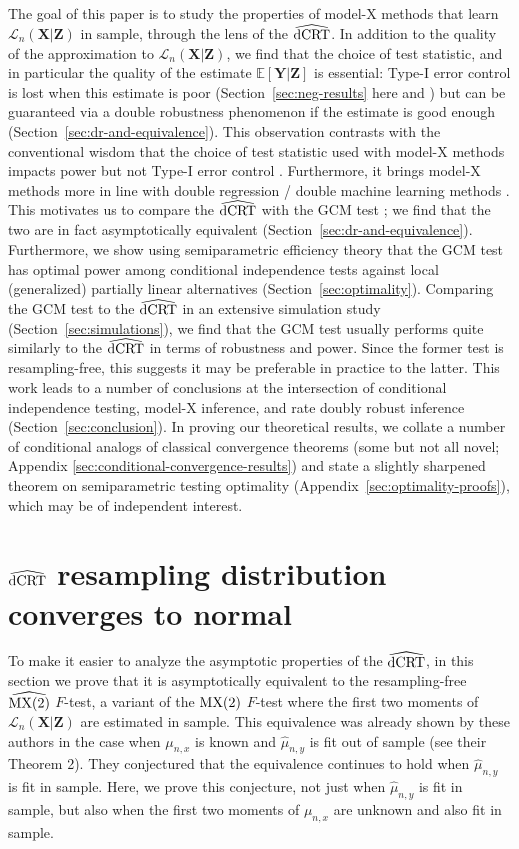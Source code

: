 \documentclass[12pt]{article}
\theoremstyle{definition}
\theoremstyle{remark}
\newcommand{\E}{\mathbb E}								%
\newcommand{\prx}{\bm X}								%
\newcommand{\prz}{\bm Z}								%
\newcommand{\pry}{{\bm Y}}								%
\newcommand{\law}{\mathcal L}							%
\newcommand{\dCRThat}{\widehat{\textnormal{dCRT}}}		%
\newcommand{\MXtwohat}{\widehat{\textnormal{MX(2)}}}		%
\newcommand{\MXtwo}{\textnormal{MX(2)}}                 %
\begin{document}
	The goal of this paper is to study the properties of model-X methods that learn $\law_n(\prx|\prz)$ in sample, through the lens of the $\dCRThat$. In addition to the quality of the approximation to $\law_n(\prx|\prz)$, we find that the choice of test statistic, and in particular the quality of the estimate $\E[\pry|\prz]$ is essential: Type-I error control is lost when this estimate is poor (Section~\ref{sec:neg-results} here and \cite{Li2022}) but can be guaranteed via a double robustness phenomenon if the estimate is good enough (Section~\ref{sec:dr-and-equivalence}). This observation contrasts with the conventional wisdom that the choice of test statistic used with model-X methods impacts power \citep{Katsevich2020a} but not Type-I error control \citep{CetL16}. Furthermore, it brings model-X methods more in line with double regression / double machine learning methods \citep{Shah2018, Chernozhukov2018}. This motivates us to compare the $\dCRThat$ with the GCM test \citep{Shah2018}; we find that the two are in fact asymptotically equivalent (Section~\ref{sec:dr-and-equivalence}). Furthermore, we show using semiparametric efficiency theory that the GCM test has optimal power among conditional independence tests against local (generalized) partially linear alternatives (Section~\ref{sec:optimality}). Comparing the GCM test to the $\dCRThat$ in an extensive simulation study (Section~\ref{sec:simulations}), we find that the GCM test usually performs quite similarly to the $\dCRThat$ in terms of robustness and power. Since the former test is resampling-free, this suggests it may be preferable in practice to the latter. This work leads to a number of conclusions at the intersection of conditional independence testing, model-X inference, and rate doubly robust inference (Section~\ref{sec:conclusion}). In proving our theoretical results, we collate a number of conditional analogs of classical convergence theorems (some but not all novel; Appendix \ref{sec:conditional-convergence-results}) and state a slightly sharpened theorem on semiparametric testing optimality (Appendix~\ref{sec:optimality-proofs}), which may be of independent interest.
	
	\section{$\dCRThat$ resampling distribution converges to normal} \label{sec:conv-to-normal}
	
	To make it easier to analyze the asymptotic properties of the $\dCRThat$, in this section we prove that it is asymptotically equivalent to the resampling-free $\MXtwohat$ $F$-test, a variant of the $\MXtwo$ $F$-test \citep{Katsevich2020a} where the first two moments of $\law_n(\prx|\prz)$ are estimated in sample. This equivalence was already shown by these authors in the case when $\mu_{n,x}$ is known and $\widehat \mu_{n,y}$ is fit out of sample (see their Theorem 2). They conjectured that the equivalence continues to hold when $\widehat \mu_{n,y}$ is fit in sample. Here, we prove this conjecture, not just when $\widehat \mu_{n,y}$ is fit in sample, but also when the first two moments of $\mu_{n,x}$ are unknown and also fit in sample.
	
\end{document}
